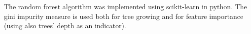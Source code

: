  The random forest algorithm was implemented using scikit-learn in python. The gini impurity measure is used both for tree growing and for feature importance (using also trees' depth as an indicator). 
%
%
%
